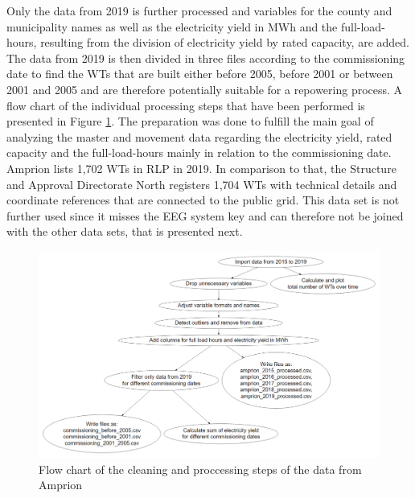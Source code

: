 \documentclass[a4paper,11pt]{article}
\begin{document}
Only the data from 2019 is further processed and variables for the county and municipality names as well as the electricity yield in MWh and the full-load-hours, resulting from the division of electricity yield by rated capacity, are added. The data from 2019 is then divided in three files according to the commissioning date to find the WTs that are built either before 2005, before 2001 or between 2001 and 2005 and are therefore potentially suitable for a repowering process. A flow chart of the individual processing steps that have been performed is presented in Figure \ref{fig:preparation}. The preparation was done to fulfill the main goal of analyzing the master and movement data regarding the electricity yield, rated capacity and the full-load-hours mainly in relation to the commissioning date. Amprion lists 1,702 WTs in RLP in 2019. In comparison to that, the Structure and Approval Directorate North registers 1,704 WTs with technical details and coordinate references that are connected to the public grid. This data set is not further used since it misses the EEG system key and can therefore not be joined with the other data sets, that is presented next.
\begin{figure}

{\centering \includegraphics[width=1\linewidth]{data/Amprion/results_of_preparation/prepflow} 

}

\caption{Flow chart of the cleaning and proccessing steps of the data from Amprion}\label{fig:preparation}
\end{figure}
\end{document}
